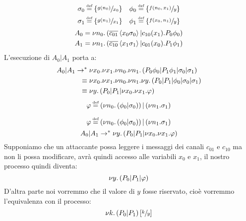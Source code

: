 \begin{frame}
    \begin{align*}
    \sigma _0 & \eqdef \set{\sfrac{g(n_0)}{x_0}} & \phi _0 & \eqdef
                                                             \set{\sfrac{
                                                             f(n_0,x_1)}{y}} \\
    \sigma _1 & \eqdef \set{\sfrac{g(n_1)}{x_1}} & \phi _1 & \eqdef
                                                             \set{\sfrac{
                                                             f(x_0,n_1)}{y}} 
  \end{align*}
  \begin{align*}
    A_0 &= \nu n_0.\left( \overline{c_{01}}\left<x_0\sigma _0\right> |
          c_{10}(x_1).P_0\phi _0 \right) \\
    A_1 &= \nu n_1.\left( \overline{c_{10}}\left<x_1\sigma _1\right> |
          c_{01}(x_0).P_1\phi _1 \right)
  \end{align*}
  L'esecuzione di $A_0|A_1$ porta a:
  \begin{align*}
    A_0 | A_1 \rightarrow ^* \;& \nu x_0.\nu x_1.\nu n_0.\nu
                            n_1.\left( P_0 \phi _0 | P_1 \phi _1 |
                            \sigma _0 | \sigma _1 \right) \\
     \equiv \; &\nu x_0.\nu x_1.\nu n_0.\nu n_1.\nu y.\left( P_0 | P_1 |
      \phi _0 | \sigma _0 | \sigma _1 \right) \\
    \equiv \; & \nu y.\left( P_0| P_1 | \nu x_0. \nu x_1. \varphi \right)
  \end{align*}
  \[ \varphi \eqdef \pa{ \nu n_0.\pa{ \phi _0 | \sigma _0}} | \pa{ \nu
      n_1 . \sigma _1 } \]
\end{frame}

\begin{frame}
  \[ \varphi \eqdef \pa{ \nu n_0.\pa{ \phi _0 | \sigma _0}} | \pa{ \nu
      n_1 . \sigma _1 } \]
  \[ A_0|A_1 \rightarrow ^* \nu y.\left( P_0| P_1 | \nu x_0. \nu x_1. \varphi \right) \]
  Supponiamo che un attaccante possa leggere i messaggi dei canali
  $c_{01}$ e $c_{10}$ ma non li possa modificare, avr\`a quindi
  accesso alle variabili $x_0$ e $x_1$, il nostro processo quindi
  diventa:
  \[ \nu y.\left( P_0| P_1 | \varphi \right) \]
  D'altra parte noi vorremmo che il valore di $y$ fosse riservato,
  cio\`e vorremmo l'equivalenza con il processo:
  \[ \nu k.\left(P_0|P_1\right)\left[\sfrac{k}{y}\right] \]
\end{frame}

